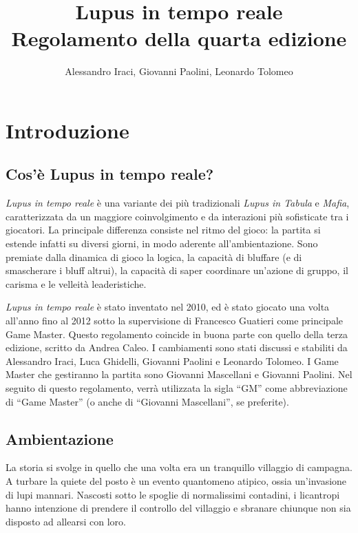 \documentclass[a4paper,10pt]{article}
\title{Lupus in tempo reale\\ Regolamento della quarta edizione}
\author{Alessandro Iraci, Giovanni Paolini, Leonardo Tolomeo}
\begin{document}
\maketitle


\section{Introduzione}

\subsection{Cos'è Lupus in tempo reale?}

\emph{Lupus in tempo reale} è una variante dei più tradizionali \emph{Lupus in
Tabula} e \emph{Mafia}, caratterizzata da un maggiore coinvolgimento e da
interazioni più sofisticate tra i giocatori.
La principale differenza consiste nel ritmo del gioco: la partita si estende
infatti su diversi giorni, in modo aderente all'ambientazione.
Sono premiate dalla dinamica di gioco la logica, la capacità di bluffare (e di
smascherare i bluff altrui), la capacità di saper coordinare un’azione di
gruppo, il carisma e le velleità leaderistiche.

\emph{Lupus in tempo reale} è stato inventato nel 2010, ed è stato giocato una
volta all'anno fino al 2012 sotto la supervisione di Francesco Guatieri come
principale Game Master.
Questo regolamento coincide in buona parte con quello della terza edizione,
scritto da Andrea Caleo.
I cambiamenti sono stati discussi e stabiliti da Alessandro Iraci, Luca
Ghidelli, Giovanni Paolini e Leonardo Tolomeo.
I Game Master che gestiranno la partita sono Giovanni Mascellani e Giovanni
Paolini.
Nel seguito di questo regolamento, verrà utilizzata la sigla ``GM'' come
abbreviazione di ``Game Master'' (o anche di ``Giovanni Mascellani'', se
preferite).

\subsection{Ambientazione}

La storia si svolge in quello che una volta era un tranquillo villaggio di
campagna. A turbare la quiete del posto è un evento quantomeno atipico, ossia
un'invasione di lupi mannari. Nascosti sotto le spoglie di normalissimi
contadini, i licantropi hanno intenzione di prendere il controllo del villaggio
e sbranare chiunque non sia disposto ad allearsi con loro.
\end{document}
